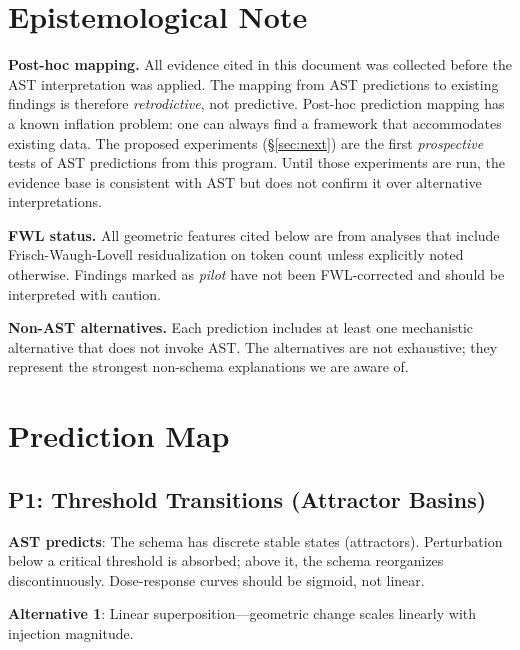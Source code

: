 \documentclass[11pt,letterpaper]{article}
\begin{document}
\section{Epistemological Note}

\textbf{Post-hoc mapping.} All evidence cited in this document was
collected before the AST interpretation was applied. The mapping from
AST predictions to existing findings is therefore \emph{retrodictive},
not predictive. Post-hoc prediction mapping has a known inflation
problem: one can always find a framework that accommodates existing
data. The proposed experiments (\S\ref{sec:next}) are the first
\emph{prospective} tests of AST predictions from this program. Until
those experiments are run, the evidence base is consistent with AST
but does not confirm it over alternative interpretations.

\textbf{FWL status.} All geometric features cited below are from
analyses that include Frisch-Waugh-Lovell residualization on token
count unless explicitly noted otherwise. Findings marked as
\emph{pilot} have not been FWL-corrected and should be interpreted
with caution.

\textbf{Non-AST alternatives.} Each prediction includes at least one
mechanistic alternative that does not invoke AST. The alternatives
are not exhaustive; they represent the strongest non-schema
explanations we are aware of.

\section{Prediction Map}

\subsection{P1: Threshold Transitions (Attractor Basins)}

\textbf{AST predicts}: The schema has discrete stable states
(attractors). Perturbation below a critical threshold is absorbed;
above it, the schema reorganizes discontinuously. Dose-response curves
should be sigmoid, not linear.

\textbf{Alternative 1}: Linear superposition---geometric change scales
linearly with injection magnitude.
\end{document}
